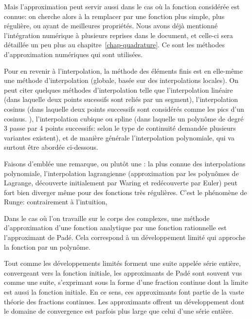 Mais l'approximation peut servir aussi dans le cas où la fonction considérée est connue:
on cherche alors à la remplacer par une fonction plus simple, plus régulière, ou ayant de meilleures 
propriétés. 
Nous avons déjà mentionné l'intégration numérique à plusieurs reprises dans le document, et 
celle-ci sera détaillée un peu plus au chapitre~\ref{chap-quadrature}. Ce sont les méthodes d'approximation
numériques qui sont utilisées.

\medskip
Pour en revenir à l'interpolation, la méthode des éléments finis est en elle-même une méthode d'interpolation (globale,
basée sur des interpolations locales).
On peut citer quelques méthodes d'interpolation telle que l'interpolation linéaire (dans laquelle deux points
sucessifs sont reliés par un segment), l'interpolation cosinus (dans laquelle deux points successifs sont
considérés comme les pics d'un cosinus. ), l'interpolation cubique ou spline (dans laquelle un polynôme
de degré 3 passe par 4 points successifs: selon le type de continuité demandée plusieurs variantes
existent), et de manière générale l'interpolation polynomiale, qui va surtout être abordée
ci-dessous.

\medskip
Faisons d'emblée une remarque, ou plutôt une : 
la plus connue des interpolations polynomiale, l'interpolation lagrangienne (approximation par les 
polynômes de Lagrange, 
découverte initialement par Waring et redécouverte par 
Euler) peut fort bien diverger même pour des fonctions 
très régulières.
C'est le phénomène de Runge: 
contrairement à l'intuition, 

\medskip
{} Dans le cas où l'on travaille sur le corps des complexes, une méthode d'approximation 
d'une fonction analytique par une fonction rationnelle est l'approximant de Padé. 
Cela correspond à un développement limité qui approche la fonction par un polynôme.

Tout comme les développements limités forment une suite appelée série entière, convergeant
 vers la fonction initiale, les approximants de Padé sont souvent vus comme une suite, s'exprimant sous la forme 
d'une fraction continue dont la limite est aussi la fonction initiale. En ce sens, ces approximants font partie de 
la vaste théorie des fractions continues.
Les approximants offrent un développement dont le domaine de convergence est parfois plus large que celui 
d'une série entière. 

